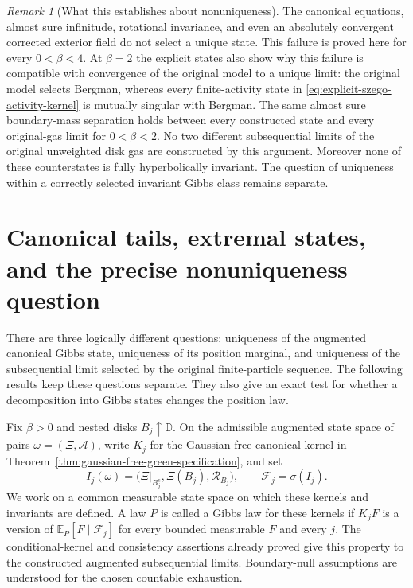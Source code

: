 \documentclass[11pt,a4paper]{article}
\numberwithin{equation}{section}
\theoremstyle{definition}
\theoremstyle{remark}
\newtheorem{remark}[theorem]{Remark}
\newcommand{\D}{\mathbb D}
\newcommand{\E}{\mathbb E}
\begin{document}
\begin{remark}[What this establishes about nonuniqueness]
The canonical equations, almost sure infinitude, rotational invariance,
and even an absolutely convergent corrected exterior field do not select
a unique state.  This failure is proved here for every $0<\beta<4$.
At $\beta=2$ the explicit states also show why this failure is compatible
with convergence of the original model to a unique limit: the original
model selects Bergman, whereas every finite-activity state in
\eqref{eq:explicit-szego-activity-kernel} is mutually singular with Bergman.  The same almost sure boundary-mass
separation holds between every constructed state and every original-gas
limit for $0<\beta<2$.
No two different subsequential limits of the original unweighted disk gas
are constructed by this argument.  Moreover none of these counterstates
is fully hyperbolically invariant.  The question of uniqueness within a
correctly selected invariant Gibbs class remains separate.
\end{remark}

\section{Canonical tails, extremal states, and the precise nonuniqueness question}
\label{sec:canonical-tail-nonuniqueness}

There are three logically different questions: uniqueness of the
augmented canonical Gibbs state, uniqueness of its position marginal,
and uniqueness of the subsequential limit selected by the original
finite-particle sequence. The following results keep these questions
separate. They also give an exact test for whether a decomposition into
Gibbs states changes the position law.

Fix $\beta>0$ and nested disks $B_j\uparrow\D$. On the admissible
augmented state space of pairs $\omega=(\Xi,\mathcal A)$, write
$K_j$ for the Gaussian-free canonical kernel in
Theorem~\ref{thm:gaussian-free-green-specification}, and set
\[
 I_j(\omega)=\bigl(\Xi\vert_{B_j^c},\Xi(B_j),\mathcal R_{B_j}\bigr),
 \qquad \mathcal F_j=\sigma(I_j).
\]
We work on a common measurable state space on which these kernels and
invariants are defined. A law $P$ is called a Gibbs law for these
kernels if $K_jF$ is a version of $\E_P[F\mid\mathcal F_j]$ for
every bounded measurable $F$ and every $j$. The conditional-kernel
and consistency assertions already proved give this property to the
constructed augmented subsequential limits. Boundary-null assumptions
are understood for the chosen countable exhaustion.
\end{document}
